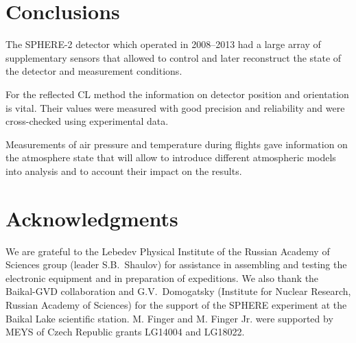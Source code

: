 \documentclass[final,5p,times,twocolumn]{elsarticle}
\begin{document}
\section{Conclusions \label{sect:conclusions}}
The SPHERE-2 detector which operated in 2008--2013 had a large array of supplementary sensors that allowed to control and later reconstruct the state of the detector and measurement conditions. 

For the reflected CL method the information on detector position and orientation is vital. Their values were measured with good precision and reliability and were cross-checked using experimental data.

Measurements of air pressure and temperature during flights gave information on the atmosphere state that will allow to introduce different atmospheric models into analysis and to account their impact on the results.

  
\section{Acknowledgments}

We are grateful to the Lebedev Physical Institute of the Russian Academy of Sciences group (leader S.B.~Shaulov) for assistance in assembling and testing the electronic equipment and in preparation of expeditions. We also thank the Baikal-GVD collaboration and G.V.~Domogatsky (Institute for Nuclear Research, Russian Academy of Sciences) for the support of the SPHERE experiment at the Baikal Lake scientific station.
M. Finger and M. Finger Jr. were supported by MEYS of Czech Republic grants LG14004 and LG18022.



\end{document}
